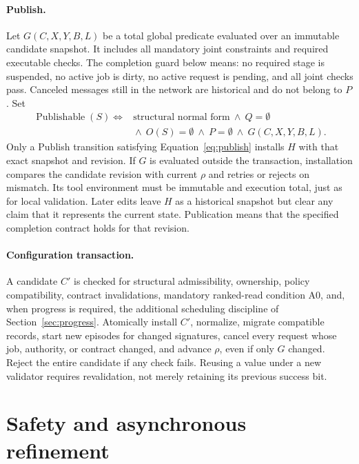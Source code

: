 \documentclass[pdflatex,sn-mathphys-num]{sn-jnl}
\theoremstyle{thmstyleone}
\theoremstyle{thmstylethree}
\theoremstyle{thmstyletwo}
\newcommand{\Pub}{\operatorname{Publishable}}
\begin{document}
\paragraph{Publish.} Let $G(C,X,Y,B,L)$ be a total global predicate evaluated over an immutable candidate snapshot. It includes all mandatory joint constraints and required executable checks. The completion guard below means: no required stage is suspended, no active job is dirty, no active request is pending, and all joint checks pass. Canceled messages still in the network are historical and do not belong to $P$. Set
\begin{equation}\label{eq:publish}
\begin{split}
\Pub(S)\iff{}&\text{structural normal form}\ \land\ Q=\emptyset\\
&{}\land\ O(S)=\emptyset\ \land\ P=\emptyset\ \land\ G(C,X,Y,B,L).
\end{split}
\end{equation}
Only a Publish transition satisfying Equation~\eqref{eq:publish} installs $H$ with that exact snapshot and revision. If $G$ is evaluated outside the transaction, installation compares the candidate revision with current $\rho$ and retries or rejects on mismatch. Its tool environment must be immutable and execution total, just as for local validation. Later edits leave $H$ as a historical snapshot but clear any claim that it represents the current state. Publication means that the specified completion contract holds for that revision.

\paragraph{Configuration transaction.} A candidate $C'$ is checked for structural admissibility, ownership, policy compatibility, contract invalidations, mandatory ranked-read condition A0, and, when progress is required, the additional scheduling discipline of Section~\ref{sec:progress}. Atomically install $C'$, normalize, migrate compatible records, start new episodes for changed signatures, cancel every request whose job, authority, or contract changed, and advance $\rho$, even if only $G$ changed. Reject the entire candidate if any check fails. Reusing a value under a new validator requires revalidation, not merely retaining its previous success bit.

\section{Safety and asynchronous refinement}\label{sec:safety}
\end{document}

